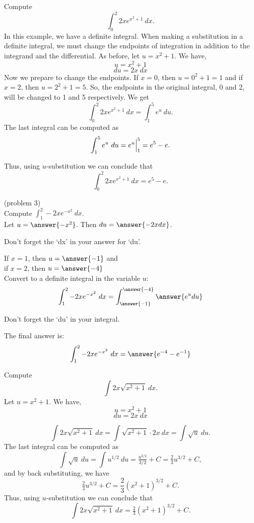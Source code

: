 \documentclass[handout]{ximera}
\begin{document}
\begin{example}[example 3] Compute 
\[\int_0^2 2xe^{x^2 + 1} \ dx.\]
In this example, we have a definite integral.  When making a substitution in a definite integral, 
we must change the endpoints of integration in addition to the integrand and the differential.
As before, let $u = x^2 + 1$.  We have,
\[u = x^2 + 1\]
\[du = 2x \ dx\]
Now we prepare to change the endpoints. If $x = 0$, then $ u = 0^2 + 1 = 1$ and if $x = 2$, then $u = 2^2 +1 = 5$.
So, the endpoints in the original integral, 0 and 2, will be changed to 1 and 5 respectively. We get
\[\int_0^2 2xe^{x^2 + 1} \ dx  = \int_1^5  e^u \ du.\]
The last integral can be computed as 
\[\int_1^5 e^u \ du = e^u \Big{|}_1^5 = e^5 - e.\]

Thus, using $u$-substitution we can conclude that
\[\int_0^2 2xe^{x^2 + 1} \ dx =  e^5 - e.\]
\end{example}



\begin{problem}(problem 3)\\
Compute $\displaystyle{\int_1^2 -2xe^{-x^2} \ dx}$.\\
Let $u = \answer{-x^2}$. Then $du = \answer{-2x dx}$.\\
\begin{hint}
Don't forget the `dx' in your answer for `du'.
\end{hint}
If $x = 1$, then $u = \answer{-1}$ and \\
if $x = 2$, then $u = \answer{-4}$\\
Convert to a definite integral in the variable $u$:
\[\int_1^2 -2xe^{-x^2} \ dx = \int_{\answer{-1}}^{\answer{-4}} \answer{e^u du}\]
\begin{hint}
Don't forget the `du' in your integral.
\end{hint}
The final answer is:
\[\int_1^2 -2xe^{-x^2} \ dx = \answer{e^{-4} - e^{-1}} \]
\end{problem}

\begin{example}[example 4] Compute 
\[\int 2x\sqrt{x^2 + 1} \ dx.\]
Let $u = x^2 + 1$.  We have,
\[u = x^2 + 1\]
\[du = 2x \ dx\]

\[\int 2x\sqrt{x^2 + 1} \ dx = \int \sqrt{x^2 + 1} \cdot 2x\  dx = \int \sqrt{u} \ du.\]
The last integral can be computed as 
\[\int \sqrt u  \ du = \int u^{1/2} \ du = \tfrac{u^{3/2}}{3/2} + C = \tfrac23 u^{3/2} + C,\]
and by back substituting, we have 
\[\tfrac23 u^{3/2}  + C = \frac23 (x^2 + 1)^{3/2} + C.\]
Thus, using $u$-substitution we can conclude that
\[\int 2x\sqrt{x^2 + 1} \ dx =  \tfrac23 (x^2 + 1)^{3/2} + C.\]
\end{example}
\end{document}
